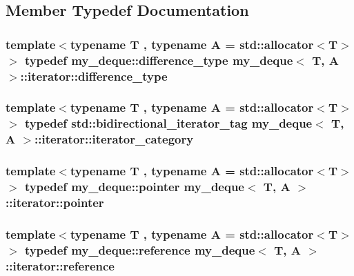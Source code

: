 \subsection{Member Typedef Documentation}
\hypertarget{classmy__deque_1_1iterator_ac5f62e8566ad92478931c2abd9ac6596}{
\subsubsection[{difference\-\_\-type}]{\setlength{\rightskip}{0pt plus 5cm}template$<$typename T , typename A  = std\-::allocator$<$\-T$>$$>$ typedef {\bf my\-\_\-deque\-::difference\-\_\-type} {\bf my\-\_\-deque}$<$ T, A $>$\-::{\bf iterator\-::difference\-\_\-type}}}\label{classmy__deque_1_1iterator_ac5f62e8566ad92478931c2abd9ac6596}
\hypertarget{classmy__deque_1_1iterator_a0479a0f5fbb1adddafb03cd2c9aaef53}{
\subsubsection[{iterator\-\_\-category}]{\setlength{\rightskip}{0pt plus 5cm}template$<$typename T , typename A  = std\-::allocator$<$\-T$>$$>$ typedef std\-::bidirectional\-\_\-iterator\-\_\-tag {\bf my\-\_\-deque}$<$ T, A $>$\-::{\bf iterator\-::iterator\-\_\-category}}}\label{classmy__deque_1_1iterator_a0479a0f5fbb1adddafb03cd2c9aaef53}
\hypertarget{classmy__deque_1_1iterator_add0e1ed49072422b5aa0ef52303fb86e}{
\subsubsection[{pointer}]{\setlength{\rightskip}{0pt plus 5cm}template$<$typename T , typename A  = std\-::allocator$<$\-T$>$$>$ typedef {\bf my\-\_\-deque\-::pointer} {\bf my\-\_\-deque}$<$ T, A $>$\-::{\bf iterator\-::pointer}}}\label{classmy__deque_1_1iterator_add0e1ed49072422b5aa0ef52303fb86e}
\hypertarget{classmy__deque_1_1iterator_ae165ee997a9e18330c593789e9899e57}{
\subsubsection[{reference}]{\setlength{\rightskip}{0pt plus 5cm}template$<$typename T , typename A  = std\-::allocator$<$\-T$>$$>$ typedef {\bf my\-\_\-deque\-::reference} {\bf my\-\_\-deque}$<$ T, A $>$\-::{\bf iterator\-::reference}}}\label{classmy__deque_1_1iterator_ae165ee997a9e18330c593789e9899e57}
